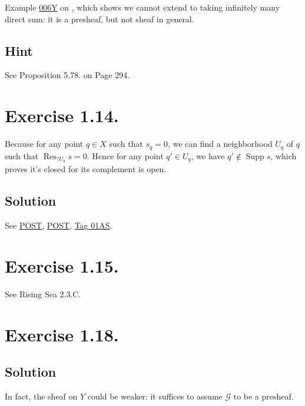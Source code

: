 Example \href{https://stacks.math.columbia.edu/tag/006Y}{006Y} on \cite{stacks-project}, which shows we cannot extend to taking infinitely many direct sum: it is a presheaf, but not sheaf in general.

\subsection{Hint}

See \cite{rotman2009introduction} Proposition 5.78. on Page 294.

\section{Exercise 1.14.}\label{Hart Chap 2 Ex 1.14.}

Because for any point $q\in X$ such that $s_q=0$, we can find a neighborhood $U_q$ of $q$ such that $\operatorname{Res}_{?U_q}s=0$. Hence for any point $q'\in U_q$, we have $q'\notin \operatorname{Supp} s$, which proves it's closed for its complement is open.

\subsection{Solution}

See \href{https://math.stackexchange.com/questions/2080018/prove-that-the-support-of-a-section-of-a-sheaf-is-a-closed-set}{POST}, \href{https://math.stackexchange.com/questions/2418007/the-support-of-a-sheaf-is-not-necessarily-closed#:~:text=Then%20we%20have%20Su,not%20closed%20in%20Zariski%20topology.}{POST}, \href{https://stacks.math.columbia.edu/tag/01AS}{Tag 01AS}.

\section{Exercise 1.15.}

See Rising Sea 2.3.C.

\section{Exercise 1.18.}

\subsection{Solution}

In fact, the sheaf on $Y$ could be weaker: it suffices to assume $\mathcal G$ to be a presheaf.


